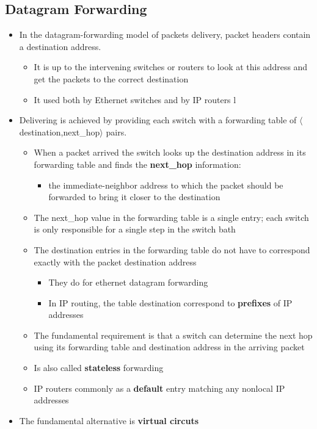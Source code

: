 \documentclass[11pt]{article}
\providecommand{\tightlist}{%
      \setlength{\itemsep}{0pt}\setlength{\parskip}{0pt}}
\begin{document}
    \subsection{Datagram Forwarding}\label{datagram-forwarding}

\begin{itemize}
\tightlist
\item
  In the datagram-forwarding model of packets delivery, packet headers
  contain a destination address.

  \begin{itemize}
  \tightlist
  \item
    It is up to the intervening switches or routers to look at this
    address and get the packets to the correct destination
  \item
    It used both by Ethernet switches and by IP routers l
  \end{itemize}
\item
  Delivering is achieved by providing each switch with a forwarding
  table of \(\langle\)destination,next\_hop\(\rangle\) pairs.

  \begin{itemize}
  \tightlist
  \item
    When a packet arrived the switch looks up the destination address in
    its forwarding table and finds the \textbf{next\_hop} information:

    \begin{itemize}
    \tightlist
    \item
      the immediate-neighbor address to which the packet should be
      forwarded to bring it closer to the destination
    \end{itemize}
  \item
    The next\_hop value in the forwarding table is a single entry; each
    switch is only responsible for a single step in the switch bath
  \item
    The destination entries in the forwarding table do not have to
    correspond exactly with the packet destination address

    \begin{itemize}
    \tightlist
    \item
      They do for ethernet datagram forwarding
    \item
      In IP routing, the table destination correspond to
      \textbf{prefixes} of IP addresses
    \end{itemize}
  \item
    The fundamental requirement is that a switch can determine the next
    hop using its forwarding table and destination address in the
    arriving packet
  \item
    Is also called \textbf{stateless} forwarding
  \item
    IP routers commonly as a \textbf{default} entry matching any
    nonlocal IP addresses
  \end{itemize}
\item
  The fundamental alternative is \textbf{virtual circuts}


\end{itemize}
\end{document}
